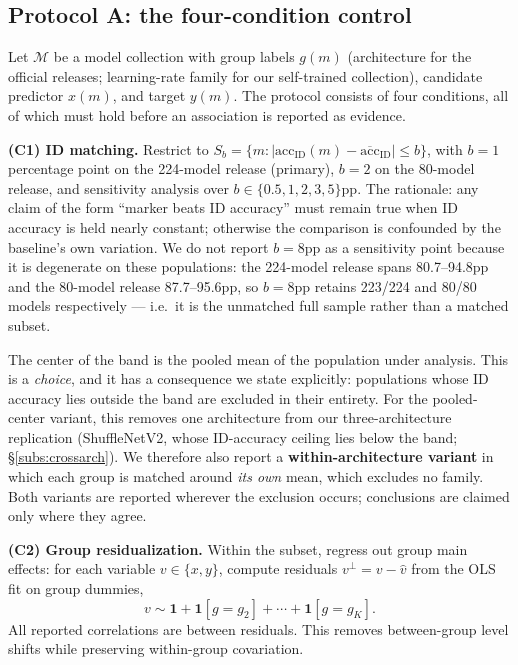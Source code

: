 \documentclass[10pt]{article} %
\newcommand{\srcref}[1]{\S\ref{#1}}
\begin{document}
\subsection{Protocol A: the four-condition control}
\label{sub:protocol}

Let $\mathcal{M}$ be a model collection with group labels $g(m)$ (architecture for the official releases; learning-rate family for our self-trained collection), candidate predictor $x(m)$, and target $y(m)$. The protocol consists of four conditions, all of which must hold before an association is reported as evidence.

\textbf{(C1) ID matching.} Restrict to $S_b = \{m : |\mathrm{acc}_{\mathrm{ID}}(m) - \overline{\mathrm{acc}}_{\mathrm{ID}}| \le b\}$, with $b = 1$ percentage point on the 224-model release (primary), $b = 2$ on the 80-model release, and sensitivity analysis over $b \in \{0.5, 1, 2, 3, 5\}$pp. The rationale: any claim of the form ``marker beats ID accuracy'' must remain true when ID accuracy is held nearly constant; otherwise the comparison is confounded by the baseline's own variation. We do not report $b=8$pp as a sensitivity point because it is degenerate on these populations: the 224-model release spans 80.7--94.8pp and the 80-model release 87.7--95.6pp, so $b=8$pp retains 223/224 and 80/80 models respectively --- i.e.\ it is the unmatched full sample rather than a matched subset.

The center of the band is the pooled mean of the population under analysis. This is a \emph{choice}, and it has a consequence we state explicitly: populations whose ID accuracy lies outside the band are excluded in their entirety. For the pooled-center variant, this removes one architecture from our three-architecture replication (ShuffleNetV2, whose ID-accuracy ceiling lies below the band; \srcref{subs:crossarch}). We therefore also report a \textbf{within-architecture variant} in which each group is matched around \emph{its own} mean, which excludes no family. Both variants are reported wherever the exclusion occurs; conclusions are claimed only where they agree.

\textbf{(C2) Group residualization.} Within the subset, regress out group main effects: for each variable $v \in \{x, y\}$, compute residuals $v^\perp = v - \hat{v}$ from the OLS fit on group dummies,
\begin{equation}
v \sim \mathbf{1} + \mathbf{1}[g = g_2] + \cdots + \mathbf{1}[g = g_K].
\end{equation}
All reported correlations are between residuals. This removes between-group level shifts while preserving within-group covariation.
\end{document}
